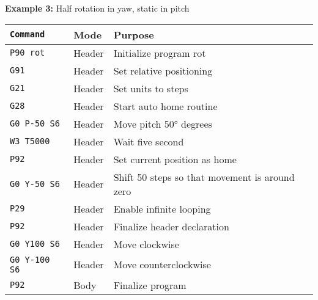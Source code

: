 \vspace{0.3cm}
\noindent
\textbf{Example 3:} Half rotation in yaw, static in pitch


\begin{tabular}{lll}
  \hline
  \texttt{Command}     & Mode   & Purpose                                        \\
  \hline
  \texttt{P90 rot}     & Header & Initialize program rot                         \\
  \texttt{G91}         & Header & Set relative positioning                       \\
  \texttt{G21}         & Header & Set units to steps                             \\
  \texttt{G28}         & Header & Start auto home routine                        \\
  \texttt{G0 P-50 S6}  & Header & Move pitch 50° degrees                         \\
  \texttt{W3 T5000}    & Header & Wait five second                                \\
  \texttt{P92}         & Header & Set current position as home                   \\
  \texttt{G0 Y-50 S6}  & Header & Shift 50 steps so that movement is around zero \\
  \texttt{P29}         & Header & Enable infinite looping                        \\
  \texttt{P92}         & Header & Finalize header declaration                    \\
  \texttt{G0 Y100 S6}  & Header & Move clockwise                                 \\
  \texttt{G0 Y-100 S6} & Header & Move counterclockwise                          \\
  \texttt{P92}         & Body   & Finalize program                               \\
  \hline
\end{tabular}

